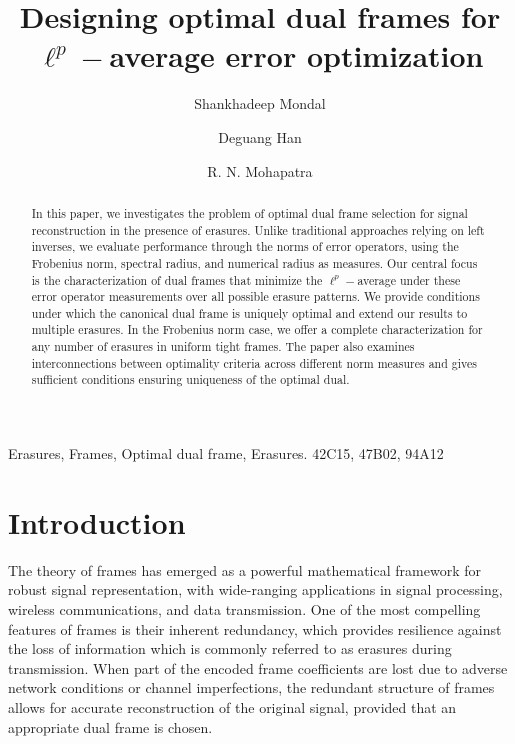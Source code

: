 \documentclass[final,1p,times]{elsarticle}
\begin{document}
	\begin{frontmatter}
	
\title{ Designing optimal dual frames for $\ell^p-$average error optimization}
        \author{Shankhadeep Mondal}
        \author{Deguang Han}
		\author{R. N. Mohapatra}
		
		
		
		\address{Department of Mathematics, University of Central Florida}
		\cortext[]{}		
		
		\begin{abstract}
		In this paper, we investigates the problem of optimal dual frame selection for signal reconstruction in the presence of erasures. Unlike traditional approaches relying on left inverses, we evaluate performance through the norms of error operators, using the Frobenius norm, spectral radius, and numerical radius as measures. Our central focus is the characterization of dual frames that minimize the $\ell^p-$average under these error operator measurements over all possible erasure patterns. We provide conditions under which the canonical dual frame is uniquely optimal and extend our results to multiple erasures. In the Frobenius norm case, we offer a complete characterization for any number of erasures in uniform tight frames. The paper also examines interconnections between optimality criteria across different norm measures and gives sufficient conditions ensuring uniqueness of the optimal dual.

		\end{abstract}
		
		
		
		
		
		\begin{keyword}
			Erasures, Frames, Optimal dual frame,  Erasures.
			\MSC[2010] 42C15, 47B02, 94A12
		\end{keyword}
		
	\end{frontmatter}
	
	\section{Introduction}
	
	The theory of frames has emerged as a powerful mathematical framework for robust signal representation, with wide-ranging applications in signal processing, wireless communications, and data transmission. One of the most compelling features of frames is their inherent redundancy, which provides resilience against the loss of information which is commonly referred to as erasures during transmission. When part of the encoded frame coefficients are lost due to adverse network conditions or channel imperfections, the redundant structure of frames allows for accurate reconstruction of the original signal, provided that an appropriate dual frame is chosen.
\end{document}
